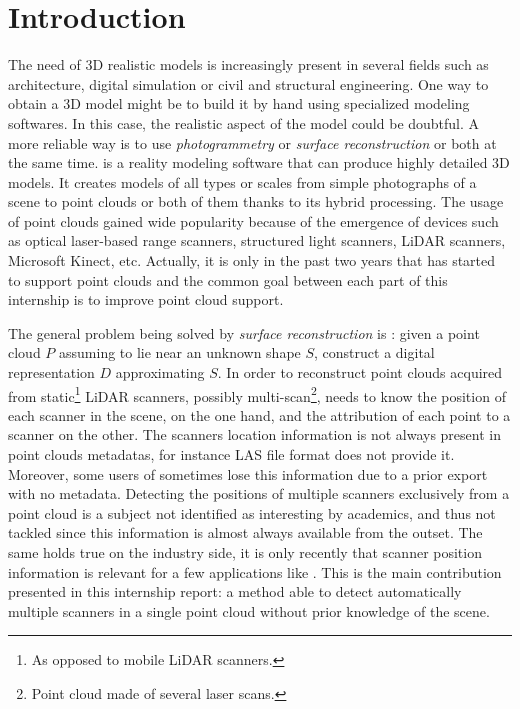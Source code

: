 \chapter{Introduction}
\label{ch:introduction}

The need of 3D realistic models is increasingly present in several fields such as architecture, digital simulation or civil and structural engineering. One way to obtain a 3D model might be to build it by hand using specialized modeling softwares. In this case, the realistic aspect of the model could be doubtful. A more reliable way is to use \emph{photogrammetry} or \emph{surface reconstruction} or both at the same time. \CC is a reality modeling software that can produce highly detailed 3D  models. It creates models of all types or scales from simple photographs of a scene to point clouds or both of them thanks to its hybrid processing. The usage of point clouds gained wide popularity because of the emergence of devices such as optical laser-based range scanners, structured light scanners, LiDAR scanners, Microsoft Kinect, etc. Actually, it is only in the past two years that \CC has started to support point clouds and the common goal between each part of this internship is to improve \CC point cloud support.

The general problem being solved by \emph{surface reconstruction} is :  given a point cloud $P$ assuming to lie near an unknown shape $S$,  construct a digital representation $D$ approximating $S$. In order to reconstruct point clouds acquired from static\footnote{As opposed to mobile LiDAR scanners.} LiDAR scanners, possibly multi-scan\footnote{Point cloud made of several laser scans.}, \CC needs to know the position of each scanner in the scene, on the one hand, and the attribution of each
point to a scanner on the other. The scanners location information is not always present in point clouds metadatas, for instance LAS file format does not provide it. Moreover, some users of \CC sometimes lose this information due to a prior export with no metadata. Detecting the positions of multiple scanners exclusively from a point cloud is a subject not identified as interesting by academics, and thus not tackled since this information is almost always available from the outset. The same holds true on the industry side, it is only recently that scanner position information is relevant for a few applications like \CC. This is the main contribution presented in this internship report: a method able to detect automatically multiple scanners in a single point cloud without prior knowledge of the scene.

